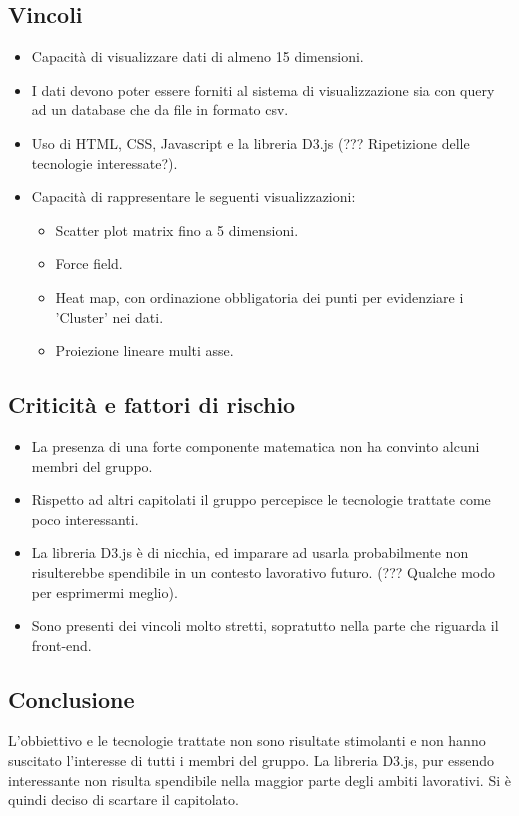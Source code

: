\subsection{Vincoli}
\begin{itemize}
\item Capacità di visualizzare dati di almeno 15 dimensioni.
\item I dati devono poter essere forniti al sistema di visualizzazione sia con query ad un database che da file in formato csv.
\item Uso di HTML, CSS, Javascript e la libreria D3.js (??? Ripetizione delle tecnologie interessate?).
\item Capacità di rappresentare le seguenti visualizzazioni:
\begin{itemize}
	\item Scatter plot matrix fino a 5 dimensioni.
	\item Force field.
	\item Heat map, con ordinazione obbligatoria dei punti per evidenziare i 'Cluster' nei dati.
	\item Proiezione lineare multi asse.
\end{itemize}
\end{itemize}

\subsection{Criticità e fattori di rischio}
\begin{itemize}
\item La presenza di una forte componente matematica non ha convinto alcuni membri del gruppo.
\item Rispetto ad altri capitolati il gruppo percepisce le tecnologie trattate come poco interessanti.
\item La libreria D3.js è di nicchia, ed imparare ad usarla probabilmente non risulterebbe spendibile in un contesto lavorativo futuro. (??? Qualche modo per esprimermi meglio).
\item Sono presenti dei vincoli molto stretti, sopratutto nella parte che riguarda il front-end.
\end{itemize}

\subsection{Conclusione}
L'obbiettivo e le tecnologie trattate non sono risultate stimolanti e non hanno suscitato l'interesse di tutti i membri del gruppo. La libreria D3.js, pur essendo interessante non risulta spendibile nella maggior parte degli ambiti lavorativi. Si è quindi deciso di scartare il capitolato.